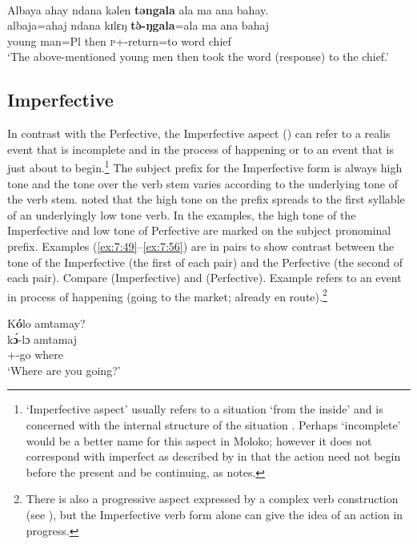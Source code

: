 \ea\label{ex:7:48}\\
Albaya  ahay  ndana  kəlen  \textbf{təngala}  ala  ma  ana  bahay.\\
\gll albaja=ahaj        ndana  kɪlɛŋ   \textbf{t\`ə-ŋgala}=ala  ma  ana   bahaj\\
{young man}=Pl  {\DEM}  then  \textsc{p}+{\PFV}-return=to   word  {\DAT} chief\\
\glt ‘The above-mentioned young men then took the word (response) to the chief.’
\z
{}

\subsection{Imperfective}\label{sec:7.4.2}
\hypertarget{RefHeading1212241525720847}{}
In contrast with the Perfective, the Imperfective aspect (\textsc{{\IFV}}) can refer to a realis event that is incomplete and in the process of happening or to an event that is just about to begin.\footnote{‘Imperfective aspect’ %
usually refers to a situation ‘from the inside’ and is concerned with the internal structure of the situation \citep[4]{Comrie1976}. Perhaps ‘incomplete’ would be a better name for this aspect in Moloko; however it does not correspond with imperfect as described by \citet{Dixon2012} in that the action need not begin before the present and be continuing, as \citet[31]{Dixon2012} notes.} The subject prefix for the Imperfective form is always high tone and the tone over the verb stem varies according to the underlying tone of the verb stem. \citet{Bow1997c} noted that the high tone on the prefix spreads to the first syllable of an underlyingly low tone verb. In the examples, the high tone of the Imperfective and low tone of Perfective are marked on the subject pronominal prefix. Examples (\ref{ex:7:49}--\ref{ex:7:56}) are in pairs to show contrast between the tone of the Imperfective (the first of each pair) and the Perfective (the second of each pair). Compare  (Imperfective) and  (Perfective). Example  refers to an event in process of happening (going to the market; already en route).\footnote{There is also a progressive aspect expressed by a complex verb construction (see ), but the Imperfective verb form alone can give the idea of an action in progress.} 

\ea\label{ex:7:49}
K\textbf{ó}lo  amtamay?\\
\gll k\textbf{\'ɔ}{}-lɔ amtamaj\\
{\twoS}+{\IFV}-go  where\\
\glt ‘Where are you going?’
\z

